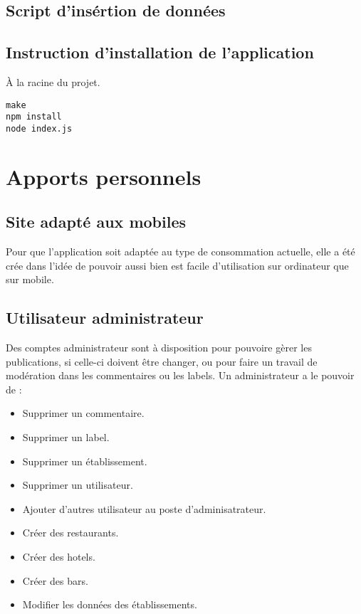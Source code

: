 \documentclass[a4paper,10pt]{article}
\begin{document}
\subsection{Script d'insértion de données}
    
    \pagebreak

\subsection{Instruction d'installation de l'application}
À la racine du projet.
\begin{lstlisting}
make
npm install
node index.js
\end{lstlisting}

\subsection{}

\section{Apports personnels}
\subsection{Site adapté aux mobiles}
    Pour que l'application soit adaptée au type de consommation actuelle, elle
    a été crée dans l'idée de pouvoir aussi bien est facile d'utilisation sur
    ordinateur que sur mobile.
\subsection{Utilisateur administrateur}
    Des comptes administrateur sont à disposition pour pouvoire gèrer les
    publications, si celle-ci doivent être changer, ou pour faire un travail de
    modération dans les commentaires ou les labels.
    Un administrateur a le pouvoir de :
    \begin{itemize}
        \item Supprimer un commentaire.
        \item Supprimer un label.
        \item Supprimer un établissement.
        \item Supprimer un utilisateur.
        \item Ajouter d'autres utilisateur au poste d'adminisatrateur.
        \item Créer des restaurants.
        \item Créer des hotels.
        \item Créer des bars.
        \item Modifier les données des établissements.
    \end{itemize}
\end{document}
